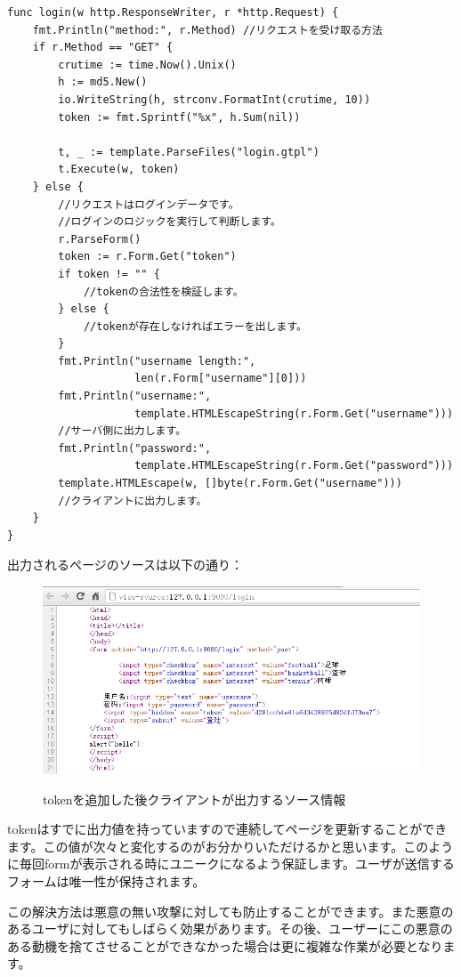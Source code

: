 \begin{lstlisting}[numbers=none]
func login(w http.ResponseWriter, r *http.Request) {
    fmt.Println("method:", r.Method) //リクエストを受け取る方法
    if r.Method == "GET" {
        crutime := time.Now().Unix()
        h := md5.New()
        io.WriteString(h, strconv.FormatInt(crutime, 10))
        token := fmt.Sprintf("%x", h.Sum(nil))

        t, _ := template.ParseFiles("login.gtpl")
        t.Execute(w, token)
    } else {
        //リクエストはログインデータです。
        //ログインのロジックを実行して判断します。
        r.ParseForm()
        token := r.Form.Get("token")
        if token != "" {
            //tokenの合法性を検証します。
        } else {
            //tokenが存在しなければエラーを出します。
        }
        fmt.Println("username length:",
                    len(r.Form["username"][0]))
        fmt.Println("username:",
                    template.HTMLEscapeString(r.Form.Get("username")))
        //サーバ側に出力します。
        fmt.Println("password:",
                    template.HTMLEscapeString(r.Form.Get("password")))
        template.HTMLEscape(w, []byte(r.Form.Get("username")))
        //クライアントに出力します。
    }
}
\end{lstlisting}

出力されるページのソースは以下の通り：

\begin{figure}[H]
  \includegraphics[width=14cm]{4.4.token.png}
   \label{図4.4}
   \caption{tokenを追加した後クライアントが出力するソース情報}
\end{figure}

tokenはすでに出力値を持っていますので連続してページを更新することができます。この値が次々と変化するのがお分かりいただけるかと思います。このように毎回formが表示される時にユニークになるよう保証します。ユーザが送信するフォームは唯一性が保持されます。

この解決方法は悪意の無い攻撃に対しても防止することができます。また悪意のあるユーザに対してもしばらく効果があります。その後、ユーザーにこの悪意のある動機を捨てさせることができなかった場合は更に複雑な作業が必要となります。
